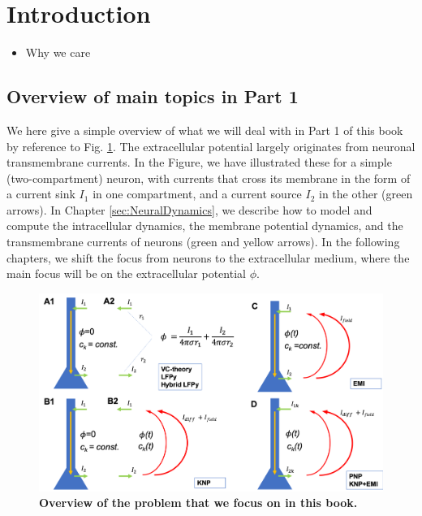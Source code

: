 \section{Introduction} 
\label{sec:Introduction}

\begin{itemize}
\item Why we care \citep{Buzsaki2012,Pettersen2012,Einevoll2013,Einevoll2013a,Einevoll2019}
\end{itemize}


\subsection{Overview of main topics in Part 1}

We here give a simple overview of what we will deal with in Part 1 of this book by reference to Fig. \ref{fig:Knallfigur}. The extracellular potential largely originates from neuronal transmembrane currents. In the Figure, we have illustrated these for a simple (two-compartment) neuron, with currents that cross its membrane in the form of a current sink $I_1$ in one compartment, and a current source $I_2$ in the other (green arrows). In Chapter \ref{sec:NeuralDynamics}, we describe how to model and compute the intracellular dynamics, the membrane potential dynamics, and the transmembrane currents of neurons (green and yellow arrows). In the following chapters, we shift the focus from neurons to the extracellular medium, where the main focus will be on the extracellular potential $\phi$.

\begin{figure}[!ht]
\begin{center}
\includegraphics[width=1\textwidth]{Figures/Skjemaoversikt.png}
\end{center}
\caption{\textbf{Overview of the problem that we focus on in this book.} 
}
\label{fig:Knallfigur}
\end{figure}

